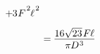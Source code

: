 \documentclass[14pt]{extarticle}
\begin{document}
\[\begin{aligned}
{+\hspace{-.1ex} 3 \hspace{.1ex} F^{\hspace{.2ex}\raisebox{.2em}{$\scriptstyle 2$}} \hspace{-0.1ex} \ell^{\hspace{.2ex}\raisebox{.2em}{$\scriptstyle 2$}}
\hspace{.2ex}}
\\[.4em]
%
&=\hspace{-0.1ex}
\displaystyle\frac{\raisebox{-.2em}{$16 \sqrt{\hspace{-.1ex}23} \hspace{.2ex} F \hspace{-.1ex} \ell$}}{\pi \hspace{-0.1ex} D^{\hspace{.1ex}3}}
\end{aligned}\]
\end{document}
